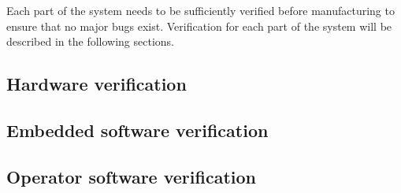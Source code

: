 Each part of the system needs to be sufficiently verified before
manufacturing to ensure that no major bugs exist. Verification for
each part of the system will be described in the following sections.

\subsection{Hardware verification}


\subsection{Embedded software verification}


\subsection{Operator software verification}

